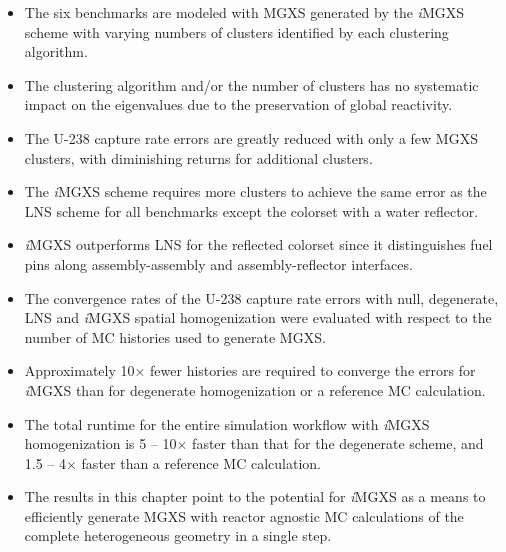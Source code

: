 \clearpage

\vfill
\begin{highlightsbox}[frametitle=Highlights]
\begin{itemize}
  \item The six benchmarks are modeled with \ac{MGXS} generated by the \textit{i}\ac{MGXS} scheme with varying numbers of clusters identified by each clustering algorithm.
  \item The clustering algorithm and/or the number of clusters has no systematic impact on the eigenvalues due to the preservation of global reactivity.
  \item The U-238 capture rate errors are greatly reduced with only a few \ac{MGXS} clusters, with diminishing returns for additional clusters.
  \item The \textit{i}\ac{MGXS} scheme requires more clusters to achieve the same error as the \ac{LNS} scheme for all benchmarks except the colorset with a water reflector.
  \item \textit{i}\ac{MGXS} outperforms \ac{LNS} for the reflected colorset since it distinguishes fuel pins along assembly-assembly and assembly-reflector interfaces.
  \item The convergence rates of the U-238 capture rate errors with null, degenerate, \ac{LNS} and \textit{i}\ac{MGXS} spatial homogenization were evaluated with respect to the number of \ac{MC} histories used to generate \ac{MGXS}.
  \item Approximately 10$\times$ fewer histories are required to converge the errors for \textit{i}\ac{MGXS} than for degenerate homogenization or a reference \ac{MC} calculation.
  \item The total runtime for the entire simulation workflow with \textit{i}\ac{MGXS} homogenization is 5 -- 10$\times$ faster than that for the degenerate scheme, and 1.5 -- 4$\times$ faster than a reference \ac{MC} calculation.
  \item The results in this chapter point to the potential for \textit{i}\ac{MGXS} as a means to efficiently generate \ac{MGXS} with reactor agnostic \ac{MC} calculations of the complete heterogeneous geometry in a single step.
\end{itemize}
\end{highlightsbox}
\vfill
